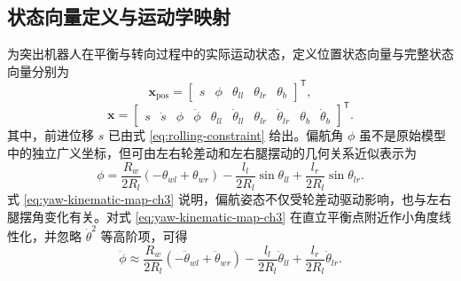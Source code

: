 \subsection{状态向量定义与运动学映射}

为突出机器人在平衡与转向过程中的实际运动状态，定义位置状态向量与完整状态向量分别为
\begin{equation}
  \boldsymbol{x}_{\mathrm{pos}}
  =
  \begin{bmatrix}
    s & \phi & \theta_{ll} & \theta_{lr} & \theta_b
  \end{bmatrix}^{\mathsf{T}},
  \label{eq:xpos-ch3}
\end{equation}
\begin{equation}
  \boldsymbol{x}
  =
  \begin{bmatrix}
    s & \dot{s} & \phi & \dot{\phi} & \theta_{ll} & \dot{\theta}_{ll} &
    \theta_{lr} & \dot{\theta}_{lr} & \theta_b & \dot{\theta}_b
  \end{bmatrix}^{\mathsf{T}}.
  \label{eq:state-vector-ch3}
\end{equation}
其中，前进位移 $s$ 已由式 \eqref{eq:rolling-constraint} 给出。偏航角 $\phi$ 虽不是原始模型中的独立广义坐标，但可由左右轮差动和左右腿摆动的几何关系近似表示为
\begin{equation}
  \phi
  =
  \frac{R_w}{2R_l}\left(-\theta_{wl} + \theta_{wr}\right)
  -
  \frac{l_l}{2R_l}\sin \theta_{ll}
  +
  \frac{l_r}{2R_l}\sin \theta_{lr}.
  \label{eq:yaw-kinematic-map-ch3}
\end{equation}
式 \eqref{eq:yaw-kinematic-map-ch3} 说明，偏航姿态不仅受轮差动驱动影响，也与左右腿摆角变化有关。对式 \eqref{eq:yaw-kinematic-map-ch3} 在直立平衡点附近作小角度线性化，并忽略 $\dot{\theta}^2$ 等高阶项，可得
\begin{equation}
  \ddot{\phi}
  \approx
  \frac{R_w}{2R_l}\left(-\ddot{\theta}_{wl} + \ddot{\theta}_{wr}\right)
  -
  \frac{l_l}{2R_l}\ddot{\theta}_{ll}
  +
  \frac{l_r}{2R_l}\ddot{\theta}_{lr}.
  \label{eq:yaw-acc-linear-ch3}
\end{equation}


